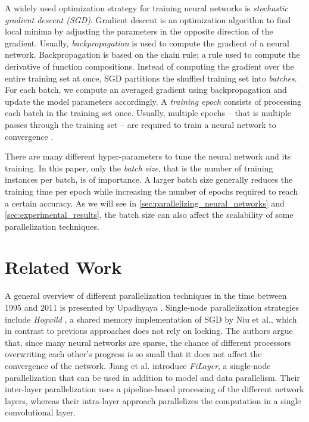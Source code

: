 \documentclass[conference,compsoc,a4paper]{IEEEtran}
\begin{document}
A widely used optimization strategy for training neural networks is \emph{stochastic gradient descent (SGD)}. %
Gradient descent is an optimization algorithm to find local minima by adjusting the parameters in the opposite direction of the gradient.
%
Usually, \emph{backpropagation} is used to compute the gradient of a neural network.
Backpropagation is based on the chain rule; a rule used to compute the derivative of function compositions.
%
Instead of computing the gradient over the entire training set at once, SGD partitions the shuffled training set into \emph{batches}.
For each batch, we compute an averaged gradient using backpropagation and update the model parameters accordingly.
%
A \emph{training epoch} consists of processing each batch in the training set once.
Usually, multiple epochs -- that is multiple passes through the training set -- are required to train a neural network to convergence \cite{chilimbi2014-Project-Adam}.

There are many different hyper-parameters to tune the neural network and its training.
In this paper, only the \emph{batch size}, that is the number of training instances per batch, is of importance.
A larger batch size generally reduces the training time per epoch while increasing the number of epochs required to reach a certain accuracy.
As we will see in \autoref{sec:parallelizing_neural_networks} and \ref{sec:experimental_results}, the batch size can also affect the scalability of some parallelization techniques.



\section{Related Work} %
\label{sec:related_work}
A general overview of different parallelization techniques in the time between 1995 and 2011 is presented by Upadhyaya \cite{upadhyaya2013parallel}.
%
Single-node parallelization strategies include \emph{Hogwild} \cite{recht2011-Hogwild}, a shared memory implementation of SGD by Niu et al., which in contrast to previous approaches does not rely on locking.
The authors argue that, since many neural networks are sparse, the chance of different processors overwriting each other's progress is so small that it does not affect the convergence of the network.
%
Jiang et al. \cite{jiang2018-FiLayer} introduce \emph{FiLayer}, a single-node parallelization that can be used in addition to model and data parallelism.
Their inter-layer parallelization uses a pipeline-based processing of the different network layers, whereas their intra-layer approach parallelizes the computation in a single convolutional layer.
\end{document}
